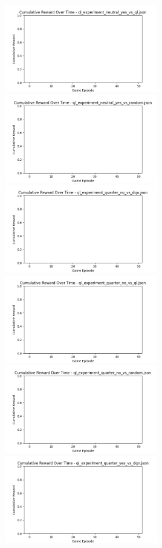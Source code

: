 \includegraphics[width=0.5\textwidth]{images/cumulative_reward_ql_experiment_neutral_yes_vs_ql.png} 
\includegraphics[width=0.5\textwidth]{images/cumulative_reward_ql_experiment_neutral_yes_vs_random.png} 
\includegraphics[width=0.5\textwidth]{images/cumulative_reward_ql_experiment_quarter_no_vs_dqn.png} 
\includegraphics[width=0.5\textwidth]{images/cumulative_reward_ql_experiment_quarter_no_vs_ql.png} 
\includegraphics[width=0.5\textwidth]{images/cumulative_reward_ql_experiment_quarter_no_vs_random.png} 
\includegraphics[width=0.5\textwidth]{images/cumulative_reward_ql_experiment_quarter_yes_vs_dqn.png} 
